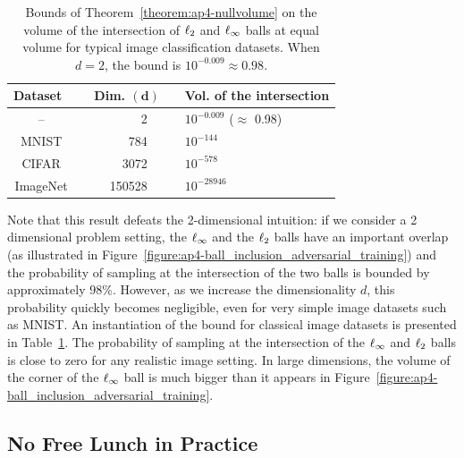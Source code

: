 \begin{table}[ht]
  \centering
  \begin{tabular}{c r r r l}
    \toprule
    \textbf{Dataset\ } & \phantom{....} & \textbf{Dim.} $\mathbf{(d)}$ & \phantom{....} & \textbf{Vol. of the intersection }\\
    \midrule
    -- & & 2\ \ & & $10^{-0.009}$ \quad ($\approx$ 0.98) \\
    MNIST & & 784\ \  & & $10^{-144}$\\
    CIFAR & & 3072\ \ & &  $10^{-578}$\\
    ImageNet & & 150528\ \ & & $10^{-28946}$\\
    \bottomrule
  \end{tabular}
  \caption{ Bounds of Theorem~\ref{theorem:ap4-nullvolume} on the volume of the intersection of  $\ell_2 $ and $\ell_\infty $ balls at equal volume for typical image classification datasets. When $d=2$, the bound is $ 10^{-0.009}\approx 0.98$.}
  \label{table:ap4-datadim}
\end{table}

Note that this result defeats the 2-dimensional intuition: if we consider a 2 dimensional problem setting, the $\ell_\infty $ and the $\ell_2 $ balls have an important overlap (as illustrated in Figure~\ref{figure:ap4-ball_inclusion_adversarial_training}) and the probability of sampling at the intersection of the two balls is bounded by approximately 98\%.
However, as we increase the dimensionality $d$, this probability quickly becomes negligible, even for very simple image datasets such as MNIST.
An instantiation of  the bound for classical image datasets is presented in Table~\ref{table:ap4-datadim}.
The probability of sampling at the intersection of the $\ell_\infty $ and $\ell_2 $ balls is close to zero for any realistic image setting.
In large dimensions, the volume of the corner of the $\ell_\infty $ ball is much bigger than it appears in Figure~\ref{figure:ap4-ball_inclusion_adversarial_training}.


\subsection{No Free Lunch in Practice}
\label{subsection:ap4-no_free_lunch_in_practice}

